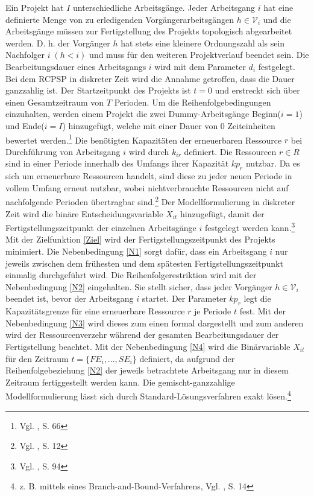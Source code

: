 \documentclass[a4paper,12pt,parskip,bibtotoc,liststotoc]{article}
\begin{document}
Ein Projekt hat $I$ unterschiedliche Arbeitsgänge. Jeder Arbeitsgang $i$ hat eine definierte Menge von zu erledigenden Vorgängerarbeitsgängen $h \in \mathcal{V}_{i}$ und die Arbeitsgänge müssen zur Fertigstellung des Projekts topologisch abgearbeitet werden. D. h. der Vorgänger $h$ hat stets eine kleinere Ordnungszahl als sein Nachfolger $i\;(h<i)$ und muss für den weiteren Projektverlauf beendet sein. Die Bearbeitungsdauer eines Arbeitsgangs $i$ wird mit dem Parameter $d_{i}$ festgelegt.  Bei dem RCPSP in diskreter Zeit wird die Annahme getroffen, dass die Dauer ganzzahlig ist. Der Startzeitpunkt des Projekts ist $t = 0$ und erstreckt sich über einen Gesamtzeitraum von $T$ Perioden. Um die Reihenfolgebedingungen einzuhalten, werden einem Projekt die zwei Dummy-Arbeitsgänge \glqq Beginn\grqq\;($i=1$) und \glqq Ende\grqq\;($i=I$) hinzugefügt, welche mit einer Dauer von $0$ Zeiteinheiten bewertet werden.\footnote{Vgl. \cite{zimmermann2006projektplanung}, S. 66} Die benötigten Kapazitäten der erneuerbaren Ressource $r$ bei Durchführung von Arbeitsgang $i$ wird durch $k_{ir}$ definiert. Die Ressourcen $r \in R$ sind in einer Periode innerhalb des Umfangs ihrer Kapazität $kp_{r}$ nutzbar. Da es sich um erneuerbare Ressourcen handelt, sind diese zu jeder neuen Periode in vollem Umfang erneut nutzbar, wobei nichtverbrauchte Ressourcen nicht auf nachfolgende Perioden übertragbar sind.\footnote{Vgl. \cite{kellenbrink2014einfuhrung}, S. 12} Der Modellformulierung in diskreter Zeit wird die binäre Entscheidungsvariable $X_{it}$ hinzugefügt, damit der Fertigstellungszeitpunkt der einzelnen Arbeitsgänge $i$ festgelegt werden kann.\footnote{Vgl. \cite{pritsker1969multiproject}, S. 94} \\%

Mit der Zielfunktion \eqref{Ziel} wird der Fertigstellungszeitpunkt des Projekts minimiert. Die Nebenbedingung \eqref{N1} sorgt dafür, dass ein Arbeitsgang $i$ nur jeweils zwischen dem frühesten und dem spätesten Fertigstellungszeitpunkt einmalig durchgeführt wird. Die Reihenfolgerestriktion wird mit der Nebenbedingung \eqref{N2} eingehalten. Sie stellt sicher, dass jeder Vorgänger $h \in \mathcal{V}_{i}$ beendet ist, bevor der Arbeitsgang $i$ startet.
Der Parameter $kp_{r}$ legt die Kapazitätsgrenze für eine erneuerbare Ressource $r$ je Periode $t$ fest. Mit der Nebenbedingung \eqref{N3} wird dieses zum einen formal dargestellt und zum anderen wird der Ressourcenverzehr während der gesamten Bearbeitungsdauer der Fertigstellung beachtet.
Mit der Nebenbedingung \eqref{N4} wird die Binärvariable $X_{it}$ für den Zeitraum $t = \{FE_{i},...,SE_{i}\}$ definiert, da aufgrund der Reihenfolgebeziehung \eqref{N2} der jeweils betrachtete Arbeitsgang nur in diesem Zeitraum fertiggestellt werden kann. Die gemischt-ganzzahlige Modellformulierung lässt sich durch Standard-Lösungsverfahren exakt lösen.\footnote{z. B. mittels eines Branch-and-Bound-Verfahrens, Vgl. \cite{kellenbrink2014einfuhrung}, S. 14}
\end{document}
